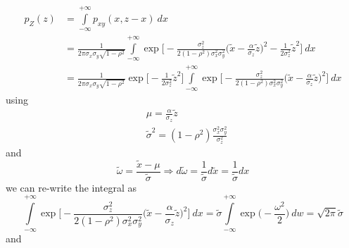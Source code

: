 \documentclass{article}
\begin{document}
\begin{equation}
    \begin{split}
        p_Z(z) & = \int\limits_{-\infty}^{+\infty} p_{xy}(x, z-x) \> dx \\
        & = \frac{1}{2\pi \sigma_x \sigma_y \sqrt{1-\rho^2}} 
        \int\limits_{-\infty}^{+\infty}
        \exp \Biggr[ 
        - \frac{\sigma^2_z}{2(1-\rho^2)\sigma^2_x\sigma^2_y} \Biggl( \tilde x - \frac{\alpha}{\sigma_z} \tilde z \Biggr)^2 - \frac{1}{2 \sigma^2_z} {\tilde z}^2
        \Biggr] \> dx \\
        & = \frac{1}{2\pi \sigma_x \sigma_y \sqrt{1-\rho^2}}
        \exp \Biggl[ - \frac{1}{2 \sigma^2_z} {\tilde z}^2 \Biggl]
        \int\limits_{-\infty}^{+\infty}
        \exp \Biggr[ 
        - \frac{\sigma^2_z}{2(1-\rho^2)\sigma^2_x\sigma^2_y} \Biggl( \tilde x - \frac{\alpha}{\sigma_z} \tilde z \Biggr)^2
        \Biggr] \> dx
    \end{split}
\end{equation}
using
\begin{equation}
    \begin{split}
        & \mu = \frac{\alpha}{\sigma_z}\tilde z \\
        & {\tilde \sigma}^2 = (1-\rho^2)\frac{\sigma^2_x\sigma^2_y}{\sigma^2_z} 
    \end{split}
\end{equation}
and
\begin{equation}
    \tilde \omega = \frac{\tilde x - \mu}{\tilde \sigma} \Rightarrow d \tilde \omega = \frac{1}{\tilde \sigma}d \tilde x = \frac{1}{\tilde \sigma}dx
\end{equation}
we can re-write the integral as
\begin{equation}
\int\limits_{-\infty}^{+\infty}
        \exp \Biggr[ 
        - \frac{\sigma^2_z}{2(1-\rho^2)\sigma^2_x\sigma^2_y} \Biggl( \tilde x - \frac{\alpha}{\sigma_z} \tilde z \Biggr)^2
        \Biggr] \> dx    =
        {\tilde \sigma}
        \int\limits_{-\infty}^{+\infty}
        \exp\bigl( -\frac{\omega^2}{2} \bigr) \> dw = \sqrt{2\pi} {\tilde \sigma}
\end{equation}
and
\end{document}
